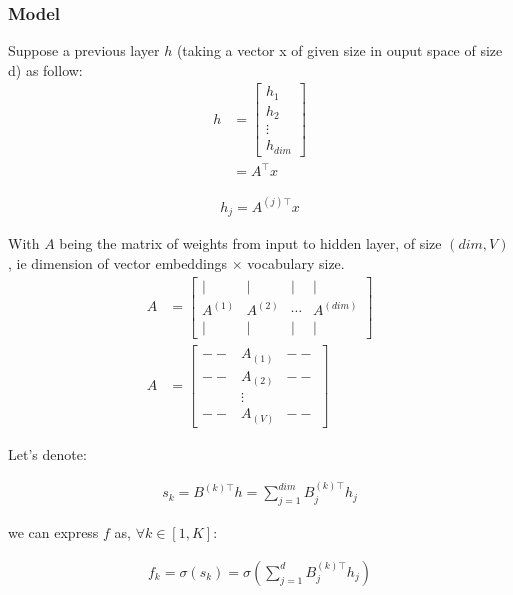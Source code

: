\cite[Enriching Word Vectors with Subword Information]{fasttextEnriching}
\cite[Bag of Tricks for Efficient Text Classification]{fasttextTricks}

\subsubsection{Model}
Suppose a previous layer $h$ (taking a vector x of given size in ouput space of size d) as follow:
\begin{align}
	h 
	&= 
	\begin{bmatrix} 
		h_1 \\
		h_2 \\
		\vdots \\
		h_{\textit{dim}}
	\end{bmatrix}\\
	&= A^{\top}x
\end{align}


\begin{align}
	h_j = A^{(j)\top}x
\end{align}

With $A$ being the matrix of weights from input to hidden layer, of size $(\textit{dim}, V)$, ie dimension of vector embeddings $\times$ vocabulary size.
\begin{align}
	A &= \left[\begin{array}{cccc}| & | & | & | \\ A^{(1)} & A^{(2)} & \cdots & A^{(\textit{dim})} \\ | & | & | & | \end{array}\right]\\
	A &= \left[
		\begin{array}{cccc} 
		  	-- & A_{(1)} & -- \\
		  	-- & A_{(2)} & -- \\
		  	&\vdots 	\\
		  	-- & A_{(V)} & --
		\end{array}\right]
\end{align}



Let's denote:

\begin{align}
	s_k  = B^{(k)\top} h = \sum_{j=1}^{\textit{dim}} B^{(k)\top}_j h_j 
\end{align}

we can express $f$ as, $\forall k \in [1, K]$:

\begin{align}
	f_k  = \sigma(s_k) = \sigma( \sum_{j=1}^{d} B^{(k)\top}_j h_j) 
\end{align}

